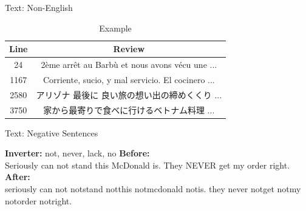 \documentclass[10pt]{beamer}
\begin{document}

\begin{frame}{Text: Non-English}

\begin{table}[ht]
\caption{Example} %
\centering %
\begin{tabular}{c c} %
\hline %
Line & Review \\ [0.5ex] %

\hline %
24 & 2ème arrêt au Barbù et nous avons vécu une  ... \\  
1167 & Corriente, sucio, y mal servicio. El cocinero  ... \\  
2580 & アリゾナ 最後に 良い旅の想い出の締めくくり  ... \\  
3750 & 家から最寄りで食べに行けるベトナム料理 ...  \\  
\hline %
\end{tabular}
\label{table:nonlin} %
\end{table}
\end{frame}



\begin{frame}{Text: Negative Sentences}

\textbf{Inverter: } not, never, lack, no
\newline
\newline
\textbf{Before:}\\
Seriously can not stand this McDonald is. They NEVER get my order right.
\newline
\newline
\textbf{After:}\\
seriously can not notstand notthis notmcdonald notis. they never notget notmy notorder notright.\\

\end{frame}
\end{document}
